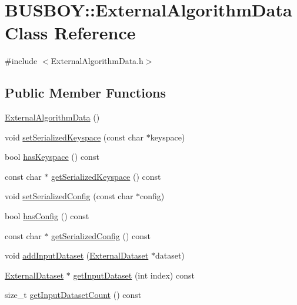 \hypertarget{classBUSBOY_1_1ExternalAlgorithmData}{
\section{BUSBOY::ExternalAlgorithmData Class Reference}
\label{classBUSBOY_1_1ExternalAlgorithmData}
}


{\ttfamily \#include $<$ExternalAlgorithmData.h$>$}\subsection*{Public Member Functions}
\begin{DoxyCompactItemize}
\item 
\hyperlink{classBUSBOY_1_1ExternalAlgorithmData_abd39c63b4007893521f3af26ab042f7c}{ExternalAlgorithmData} ()
\item 
void \hyperlink{classBUSBOY_1_1ExternalAlgorithmData_a33b9b0bcf3fb25fa0b47db2f421ad3c1}{setSerializedKeyspace} (const char $\ast$keyspace)
\item 
bool \hyperlink{classBUSBOY_1_1ExternalAlgorithmData_a85213fc0a8c757e3a264905788871ad3}{hasKeyspace} () const 
\item 
const char $\ast$ \hyperlink{classBUSBOY_1_1ExternalAlgorithmData_a93aacf007a373effdc54ebc4dfd8bc62}{getSerializedKeyspace} () const 
\item 
void \hyperlink{classBUSBOY_1_1ExternalAlgorithmData_a450b04e947f80f3c37b45405b48d5ce4}{setSerializedConfig} (const char $\ast$config)
\item 
bool \hyperlink{classBUSBOY_1_1ExternalAlgorithmData_adfe93cb9bac11621edd95c2037d4c308}{hasConfig} () const 
\item 
const char $\ast$ \hyperlink{classBUSBOY_1_1ExternalAlgorithmData_ad1fb4f6f044c40c4c111594fb0358991}{getSerializedConfig} () const 
\item 
void \hyperlink{classBUSBOY_1_1ExternalAlgorithmData_a48d0824fa9db5fcb88cd7fea8805af26}{addInputDataset} (\hyperlink{classBUSBOY_1_1ExternalDataset}{ExternalDataset} $\ast$dataset)
\item 
\hyperlink{classBUSBOY_1_1ExternalDataset}{ExternalDataset} $\ast$ \hyperlink{classBUSBOY_1_1ExternalAlgorithmData_a04a0faf533e8810653f0ed993de7ffae}{getInputDataset} (int index) const 
\item 
size\_\-t \hyperlink{classBUSBOY_1_1ExternalAlgorithmData_a077b4e0b405fe7332c95f47879eec165}{getInputDatasetCount} () const 
\item 

\end{DoxyCompactItemize}

